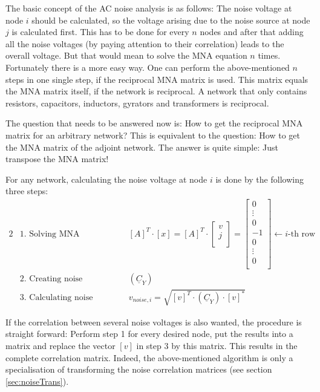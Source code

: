 \addvspace{12pt}

The basic concept of the AC noise analysis is as follows: The
noise voltage at node $i$ should be calculated, so the voltage arising
due to the noise source at node $j$ is calculated first. This has to
be done for every $n$ nodes and after that adding all the noise
voltages (by paying attention to their correlation) leads to the
overall voltage. But that would mean to solve the MNA equation $n$
times.  Fortunately there is a more easy way.  One can perform the
above-mentioned $n$ steps in one single step, if the reciprocal MNA
matrix is used. This matrix equals the MNA matrix itself, if the
network is reciprocal.  A network that only contains resistors,
capacitors, inductors, gyrators and transformers is reciprocal.

\addvspace{12pt}

The question that needs to be answered now is: How to get the
reciprocal MNA matrix for an arbitrary network? This is equivalent to
the question: How to get the MNA matrix of the adjoint network.
The answer is quite simple: Just transpose the MNA matrix!

\addvspace{12pt}

For any network, calculating the noise voltage at node $i$ is done by
the following three steps:
\begin{alignat}{2}
 & \textrm{1. Solving MNA equation:} & \qquad & \left[A\right]^T \cdot \left[x\right] =
\left[A\right]^T \cdot
\begin{bmatrix}
v \\
j \\
\end{bmatrix}
=
\begin{bmatrix}
0 \\
\vdots \\
0 \\
-1 \\
0 \\
\vdots \\
0 \\
\end{bmatrix}
\leftarrow i\textrm{-th row} \\
 & \textrm{2. Creating noise correlation matrix:} & \qquad
 & \left( \underline{C}_Y \right) \\
 & \textrm{3. Calculating noise voltage:} & \qquad
 & v_{noise,i} = \sqrt{\left[v\right]^T \cdot \left( \underline{C}_Y \right) \cdot \left[v\right]^*}
\end{alignat}

If the correlation between several noise voltages is also wanted, the
procedure is straight forward: Perform step 1 for every desired node,
put the results into a matrix and replace the vector $[v]$ in step 3
by this matrix. This results in the complete correlation matrix.
Indeed, the above-mentioned algorithm is only a specialisation of
transforming the noise correlation matrices (see section
\ref{sec:noiseTrans}).

